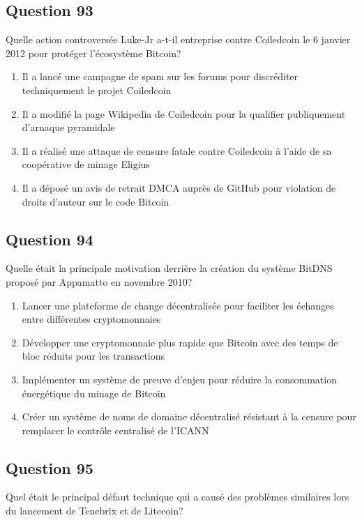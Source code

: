 \documentclass[12pt,a4paper]{article}
\begin{document}
\bigskip


\subsection*{Question 93}
Quelle action controversée Luke-Jr a-t-il entreprise contre Coiledcoin le 6 janvier 2012 pour protéger l'écosystème Bitcoin?

\begin{enumerate}[label=\Alph*., leftmargin=*]
\item Il a lancé une campagne de spam sur les forums pour discréditer techniquement le projet Coiledcoin
\item Il a modifié la page Wikipedia de Coiledcoin pour la qualifier publiquement d'arnaque pyramidale
\item Il a réalisé une attaque de censure fatale contre Coiledcoin à l'aide de sa coopérative de minage Eligius
\item Il a déposé un avis de retrait DMCA auprès de GitHub pour violation de droits d'auteur sur le code Bitcoin
\end{enumerate}

\bigskip


\subsection*{Question 94}
Quelle était la principale motivation derrière la création du système BitDNS proposé par Appamatto en novembre 2010?

\begin{enumerate}[label=\Alph*., leftmargin=*]
\item Lancer une plateforme de change décentralisée pour faciliter les échanges entre différentes cryptomonnaies
\item Développer une cryptomonnaie plus rapide que Bitcoin avec des temps de bloc réduits pour les transactions
\item Implémenter un système de preuve d'enjeu pour réduire la consommation énergétique du minage de Bitcoin
\item Créer un système de noms de domaine décentralisé résistant à la censure pour remplacer le contrôle centralisé de l'ICANN
\end{enumerate}

\bigskip


\subsection*{Question 95}
Quel était le principal défaut technique qui a causé des problèmes similaires lors du lancement de Tenebrix et de Litecoin?
\end{document}
